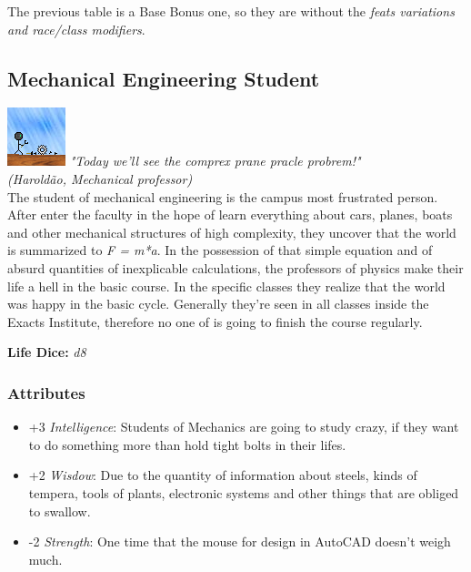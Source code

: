 \documentclass[ letterpaper,12pt]{article}
\begin{document}
The previous table is a Base Bonus one, so they are without the {\it feats variations and race/class modifiers}.\\

\subsection{Mechanical Engineering Student}
\includegraphics{../data/classes/Img/engmecanica.png}
{\it "Today we'll see the comprex prane pracle probrem!"\\ (Haroldão, Mechanical professor)}\\

The student of mechanical engineering is the campus most frustrated person. After enter the faculty in the hope of learn everything about cars, planes, boats and other mechanical structures of high complexity, they uncover that the world is summarized to {\it F = m*a}. In the possession of that simple equation and of absurd quantities of inexplicable calculations, the professors of physics make their life a hell in the basic course. In the specific classes they realize that the world was happy in the basic cycle. Generally they're seen in all classes inside the Exacts Institute, therefore no one of is going to finish the course regularly.

{\bf Life Dice: } {\it d8}

\subsubsection{Attributes}
\begin{itemize}
\item{+3 {\it Intelligence}: Students  of Mechanics are going to study crazy, if they want to  do something more than  hold tight bolts in their lifes.}
\item{+2 {\it Wisdow}: Due  to the quantity of information about steels,  kinds  of   tempera,   tools  of plants,  electronic   systems  and  other things that  are  obliged to swallow.}
\item{-2 {\it Strength}: One  time that the  mouse  for  design  in  AutoCAD doesn't weigh much.}
\end{itemize}
\end{document}

